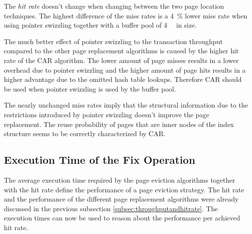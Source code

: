     The \emph{hit rate} doesn't change when changing between the two page location techniques. The highest difference of the miss rates is a \SI{4}{\percent} lower miss rate when using pointer swizzling together with a buffer pool of \SI{4}{\gibi\byte} in size.

    The much better effect of pointer swizzling to the transaction throughput compared to the other page replacement algorithms is caused by the higher hit rate of the CAR algorithm. The lower amount of page misses results in a lower overhead due to pointer swizzling and the higher amount of page hits results in a higher advantage due to the omitted hash table lookups. Therefore CAR should be used when pointer swizzling is used by the buffer pool.

    The nearly unchanged miss rates imply that the structural information due to the restrictions introduced by pointer swizzling doesn't improve the page replacement. The reuse probability of pages that are inner nodes of the index structure seems to be correctly characterized by CAR.

\subsection{Execution Time of the Fix Operation}

    The average execution time required by the page eviction algorithms together with the hit rate define the performance of a page eviction strategy. The hit rate and the performance of the different page replacement algorithms were already discussed in the previous subsection \ref{subsec:throughputandhitrate}. The execution times can now be used to reason about the performance per achieved hit rate.

